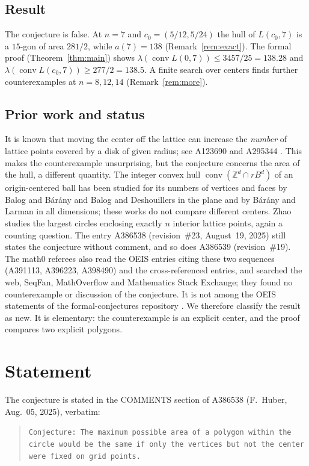\documentclass[11pt]{amsart}
\theoremstyle{plain}
\theoremstyle{definition}
\newcommand{\Z}{\mathbb{Z}}
\DeclareMathOperator{\conv}{conv}
\newcommand{\vol}{\lambda}
\begin{document}
\subsection*{Result}
The conjecture is false. At $n=7$ and $c_0=(5/12,5/24)$ the hull of $L(c_0,7)$ is a $15$-gon of area $281/2$, while $a(7)=138$ (Remark~\ref{rem:exact}). The formal proof (Theorem~\ref{thm:main}) shows $\vol(\conv L(0,7))\le 3457/25=138.28$ and $\vol(\conv L(c_0,7))\ge 277/2=138.5$. A finite search over centers finds further counterexamples at $n=8,12,14$ (Remark~\ref{rem:more}).

\subsection*{Prior work and status}
It is known that moving the center off the lattice can increase the \emph{number} of lattice points covered by a disk of given radius; see A123690 and A295344 \cite{A123690,A295344}. This makes the counterexample unsurprising, but the conjecture concerns the area of the hull, a different quantity. The integer convex hull $\conv(\Z^d\cap rB^d)$ of an origin-centered ball has been studied for its numbers of vertices and faces by Balog and B\'ar\'any \cite{BB} and Balog and Deshouillers \cite{BD} in the plane and by B\'ar\'any and Larman \cite{BL} in all dimensions; these works do not compare different centers. Zhao \cite{Zhao1,Zhao2} studies the largest circles enclosing exactly $n$ interior lattice points, again a counting question.
The entry A386538 (revision~\#23, August~19, 2025) still states the conjecture without comment, and so does A386539 (revision~\#19). The math0 referees also read the OEIS entries citing these two sequences (A391113, A396223, A398490) and the cross-referenced entries, and searched the web, SeqFan, MathOverflow and Mathematics Stack Exchange; they found no counterexample or discussion of the conjecture. It is not among the OEIS statements of the formal-conjectures repository \cite{FC}.
We therefore classify the result as new. It is elementary: the counterexample is an explicit center, and the proof compares two explicit polygons.

\section{Statement}\label{sec:statement}

The conjecture is stated in the COMMENTS section of A386538 (F.~Huber, Aug.~05, 2025), verbatim:
\begin{quote}
\texttt{Conjecture: The maximum possible area of a polygon within the circle would be the same if only the vertices but not the center were fixed on grid points.}
\end{quote}
\end{document}
